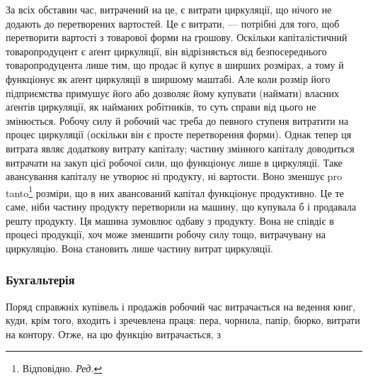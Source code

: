 За всіх обставин час, витрачений на це, є витрати циркуляції, що
нічого не додають до перетворених вартостей. Це є витрати, — потрібні
для того, щоб перетворити вартості з товарової форми на грошову.
Оскільки капіталістичний товаропродуцент є аґент циркуляції, він відрізняється
від безпосереднього товаропродуцента лише тим, що продає й
купує в ширших розмірах, а тому й функціонує як аґент циркуляції в
ширшому маштабі. Але коли розмір його підприємства примушує його
або дозволяє йому купувати (наймати) власних аґентів циркуляції, як
найманих робітників, то суть справи від цього не змінюється. Робочу
силу й робочий час треба до певного ступеня витратити на процес циркуляції
(оскільки він є просте перетворення форми). Однак тепер ця витрата
являє додаткову витрату капіталу; частину змінного капіталу доводиться
витрачати на закуп цієї робочої сили, що функціонує лише в
циркуляції. Таке авансування капіталу не утворює ні продукту, ні
вартости. Воно зменшує pro tanto\footnote*{
Відповідно. \emph{Ред.}
} розміри, що в них авансований
капітал функціонує продуктивно. Це те саме, ніби частину продукту
перетворили на машину, що купувала б і продавала решту продукту. Ця
машина зумовлює одбаву з продукту. Вона не співдіє в процесі продукції,
хоч може зменшити робочу силу тощо, витрачувану на циркуляцію.
Вона становить лише частину витрат циркуляції.

\subsubsection{Бухгальтерія}

Поряд справжніх купівель і продажів робочий час витрачається на
ведення книг, куди, крім того, входить і зречевлена праця: пера, чорнила,
папір, бюрко, витрати на контору. Отже, на цю функцію витрачається, з
\parbreak{}  %
